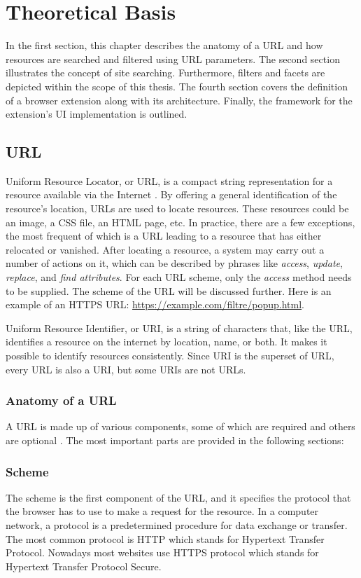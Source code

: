 \newpage
\chapter{Theoretical Basis}
In the first section, this chapter describes the anatomy of a URL and how resources are searched and filtered using URL parameters. The second section illustrates the concept of site searching. Furthermore, filters and facets are depicted within the scope of this thesis. The fourth section covers the definition of a browser extension along with its architecture. Finally, the framework for the extension's UI implementation is outlined.


\section{URL}
Uniform Resource Locator, or URL, is a compact string representation for a resource available via the Internet \autocite{berners1994uniform}. By offering a general identification of the resource's location, URLs are used to locate resources. These resources could be an image, a CSS file, an HTML page, etc. In practice, there are a few exceptions, the most frequent of which is a URL leading to a resource that has either relocated or vanished. After locating a resource, a system may carry out a number of actions on it, which can be described by phrases like \emph{access}, \emph{update}, \emph{replace}, and \emph{find attributes}. For each URL scheme, only the \emph{access} method needs to be supplied. The scheme of the URL will be discussed further. Here is an example of an HTTPS URL: \url{https://example.com/filtre/popup.html}.

Uniform Resource Identifier, or URI, is a string of characters that, like the URL, identifies a resource on the internet by location, name, or both. It makes it possible to identify resources consistently. Since URI is the superset of URL, every URL is also a URI, but some URIs are not URLs.

\subsection{Anatomy of a URL}
\label{url_anatomy}
A URL is made up of various components, some of which are required and others are optional \autocite{mozilla2022url}. The most important parts are provided in the following sections:

\subsection*{Scheme}
The scheme is the first component of the URL, and it specifies the protocol that the browser has to use to make a request for the resource. In a computer network, a protocol is a predetermined procedure for data exchange or transfer. The most common protocol is HTTP which stands for Hypertext Transfer Protocol. Nowadays most websites use HTTPS protocol which stands for Hypertext Transfer Protocol Secure.

